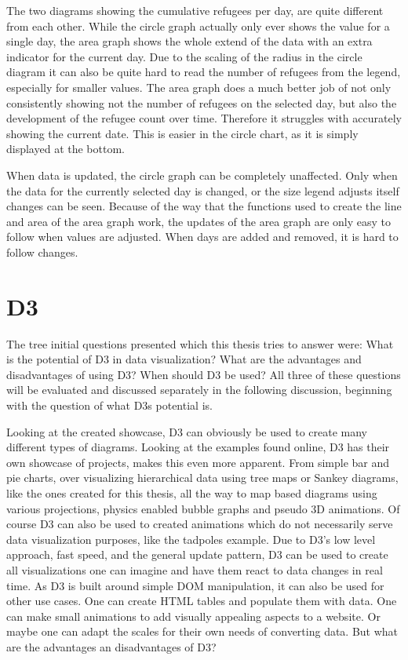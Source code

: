 The two diagrams showing the cumulative refugees per day, are quite different from each other. While the circle graph actually only ever shows the value for a single day, the area graph shows the whole extend of the data with an extra indicator for the current day.
Due to the scaling of the radius in the circle diagram it can also be quite hard to read the number of refugees from the legend, especially for smaller values.
The area graph does a much better job of not only consistently showing not the number of refugees on the selected day, but also the development of the refugee count over time. Therefore it struggles with accurately showing the current date. This is easier in the circle chart, as it is simply displayed at the bottom.

When data is updated, the circle graph can be completely unaffected. Only when the data for the currently selected day is changed, or the size legend adjusts itself changes can be seen. Because of the way that the functions used to create the line and area of the area graph work, the updates of the area graph are only easy to follow when values are adjusted. When days are added and removed, it is hard to follow changes.


\section{D3}\label{sec:d3-dis}
The tree initial questions presented which this thesis tries to answer were: What is the potential of D3 in data visualization? What are the advantages and disadvantages of using D3? When should D3 be used? All three of these questions will be evaluated and discussed separately in the following discussion, beginning with the question of what D3s potential is. 

Looking at the created showcase, D3 can obviously be used to create many different types of diagrams. Looking at the examples found online, D3 has their own showcase of projects, makes this even more apparent. From simple bar and pie charts, over visualizing hierarchical data using tree maps or Sankey diagrams, like the ones created for this thesis, all the way to map based diagrams using various projections\cite{davies}, physics enabled bubble graphs\cite{carter_2012} and pseudo 3D animations\cite{davies_sphere}. Of course D3 can also be used to created animations which do not necessarily serve data visualization purposes, like the tadpoles example\cite{bostock_2020}. Due to D3's low level approach, fast speed, and the general update pattern, D3 can be used to create all visualizations one can imagine and have them react to data changes in real time. As D3 is built around simple DOM manipulation, it can also be used for other use cases. One can create HTML tables and populate them with data. One can make small animations to add visually appealing aspects to a website. Or maybe one can adapt the scales for their own needs of converting data. But what are the advantages an disadvantages of D3?

